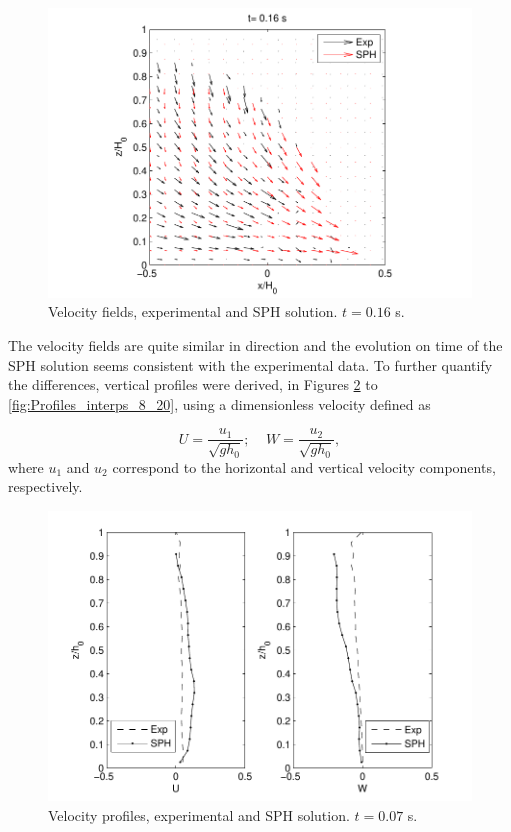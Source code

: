 %
\begin{figure}[ht!]
	\centering
	\includegraphics[width=0.70\linewidth]{Figures/5.Chapter/comp_17}
	\caption{Velocity fields, experimental and \ac{SPH} solution. $t=0.16$ s.}
	\label{fig:comp_17} 
\end{figure}
%

The velocity fields are quite similar in direction and the evolution on time of the \ac{SPH} solution seems consistent with the experimental data. To further quantify the differences, vertical profiles were derived, in Figures \ref{fig:Profiles_interps_8_8} to \ref{fig:Profiles_interps_8_20}, using a dimensionless velocity defined as 

%
\begin{equation} \label{eq:non_dim_vel}
	U=\frac{u_1}{\sqrt{gh_0}};\;\;\;\; W=\frac{u_2}{\sqrt{gh_0}},
\end{equation}
%
where $u_1$ and $u_2$ correspond to the horizontal and vertical velocity components, respectively.
%
\begin{figure}[H]
	\centering
	\includegraphics[width=0.65\linewidth]{Figures/5.Chapter/Profiles_interps_8_8}
	\caption{Velocity profiles, experimental and \ac{SPH} solution. $t=0.07$ s.}
	\label{fig:Profiles_interps_8_8} 
\end{figure}
%

